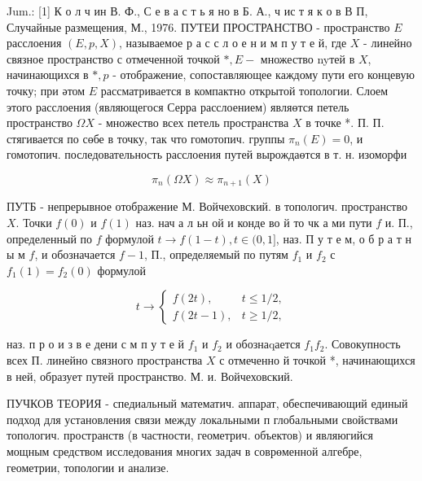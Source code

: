 \documentclass[10pt]{article}
\begin{document}
Jum.: [1] К о л ч ин В. Ф., С е в а с т ь я но в Б. А., ч ис т я к о в В П, Случайные размещения, М., 1976. ПУТЕИ ПРОСТРАНСТВО - пространство $E$ расслоения $(E, p, X)$, называемое р а с с л о е н и м п у т е й, где $X$ - линейно связное пространство с отмеченной точкой $*, E-$ множество nyтей в $X$, начинающихся в $*, p$ - отображение, сопоставляющее каждому пути его концевую точку; при әтом $E$ рассматривается в компактно открытой топологии. Слоем этого расслоения (являющегося Серра расслоением) являөтся петель пространство $\Omega X$ - множество всех петель пространства $X$ в точке *. П. П. стягивается по сөбе в точку, так что гомотопич. группы $\pi_{n}(E)=0$, и гомотопич. последовательность расслоения путей вырождаөтся в т. н. изоморфи



\[

\pi_{n}(\Omega X) \approx \pi_{n+1}(X)

\]



ПУТБ - непрерывное отображение М. Войчеховский. в топологич. пространство $X$. Точки $f(0)$ и $f(1)$ наз. нач а л ьн ой и конде во й то чк а ми пути $f$ и. П., определенный по $f$ формулой $t \rightarrow f(1-t), t \in(0,1]$, наз. П у т е м, о б р а т н ы м $f$, и обозначается $f-1$, П., определяемый по путям $f_{1}$ и $f_{2}$ с $f_{1}(1)=f_{2}(0)$ формулой



\[

t \longrightarrow \begin{cases}f(2 t), & t \leqslant 1 / 2, \\ f(2 t-1), & t \geqslant 1 / 2,\end{cases}

\]



наз. п р о и з в е дени с м п у т е й $f_{1}$ и $f_{2}$ и обознаqается $f_{1} f_{2}$. Совокупность всех П. линейно связного пространства $X$ с отмеченно й точкой *, начинающихся в ней, образует путей пространство. М. и. Войчеховский.



ПУЧКОВ ТЕОРИЯ - спедиальный математич. аппарат, обеспечивающий единый подход для установления связи между локальными п глобальными свойствами топологич. пространств (в частности, геометрич. объектов) и являюгийся мощным средством исследования многих задач в соврөменной алгебре, геометрии, топологии и анализе.
\end{document}
